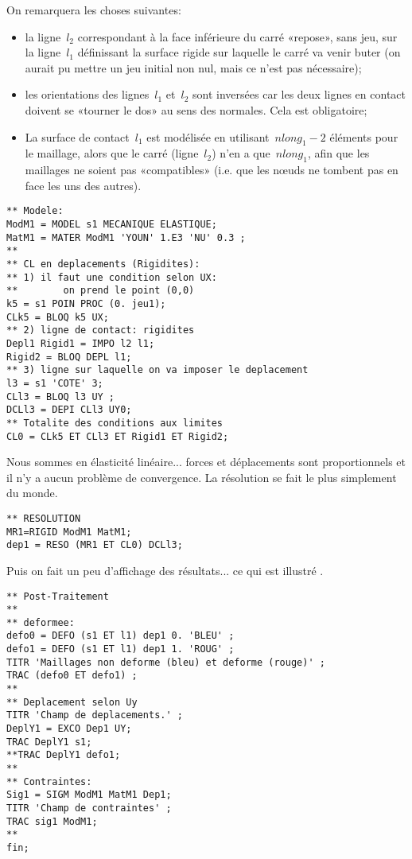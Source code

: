 On remarquera les choses suivantes:
\begin{itemize}
  \item la ligne~$l_2$ correspondant à la face inférieure du carré «repose», sans jeu, sur la ligne~$l_1$ définissant la surface rigide sur laquelle le carré va venir buter (on aurait pu mettre un jeu initial non nul, mais ce n'est pas nécessaire);
  \item les orientations des lignes~$l_1$ et~$l_2$ sont inversées car les deux lignes en contact doivent se  «tourner le dos» au sens des normales. Cela est obligatoire;
  \item La surface de contact~$l_1$ est modélisée en utilisant~$nlong_1-2$ éléments pour le maillage, alors que le carré (ligne~$l_2$) n'en a que~$nlong_1$, afin que les maillages ne soient pas «compatibles» (i.e. que les nœuds ne tombent pas en face les uns des autres).
\end{itemize}
\begin{multicols}{2}
\begin{lstlisting}[firstnumber=last]
** Modele:
ModM1 = MODEL s1 MECANIQUE ELASTIQUE;
MatM1 = MATER ModM1 'YOUN' 1.E3 'NU' 0.3 ;
**
** CL en deplacements (Rigidites):
** 1) il faut une condition selon UX: 
**        on prend le point (0,0)
k5 = s1 POIN PROC (0. jeu1);
CLk5 = BLOQ k5 UX;
** 2) ligne de contact: rigidites
Depl1 Rigid1 = IMPO l2 l1;
Rigid2 = BLOQ DEPL l1;
** 3) ligne sur laquelle on va imposer le deplacement
l3 = s1 'COTE' 3;
CLl3 = BLOQ l3 UY ;
DCLl3 = DEPI CLl3 UY0;
** Totalite des conditions aux limites
CL0 = CLk5 ET CLl3 ET Rigid1 ET Rigid2;
\end{lstlisting}
\end{multicols}

Nous sommes en élasticité linéaire... forces et déplacements sont proportionnels et il n'y a aucun problème de convergence. La résolution se fait le plus simplement du monde.
\begin{lstlisting}[firstnumber=last]
** RESOLUTION
MR1=RIGID ModM1 MatM1;
dep1 = RESO (MR1 ET CL0) DCLl3;
\end{lstlisting}

Puis on fait un peu d'affichage des résultats... ce qui est illustré .
\begin{multicols}{2}
\begin{lstlisting}[firstnumber=last]
** Post-Traitement
**
** deformee:
defo0 = DEFO (s1 ET l1) dep1 0. 'BLEU' ;
defo1 = DEFO (s1 ET l1) dep1 1. 'ROUG' ;
TITR 'Maillages non deforme (bleu) et deforme (rouge)' ;
TRAC (defo0 ET defo1) ;
**
** Deplacement selon Uy
TITR 'Champ de deplacements.' ;
DeplY1 = EXCO Dep1 UY;
TRAC DeplY1 s1;
**TRAC DeplY1 defo1;
**
** Contraintes:
Sig1 = SIGM ModM1 MatM1 Dep1;
TITR 'Champ de contraintes' ;
TRAC sig1 ModM1;
**
fin;
\end{lstlisting}
\end{multicols}

